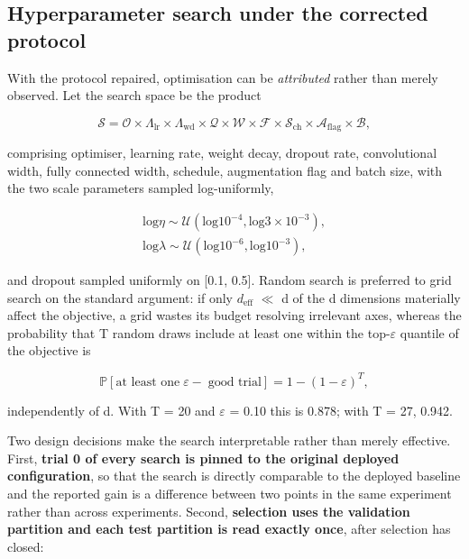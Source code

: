 \FloatBarrier

\subsection{Hyperparameter search under the corrected protocol}

With the protocol repaired, optimisation can be \emph{attributed} rather than merely observed. Let the search space be the product

\begin{equation}
\label{eq:100}
\mathcal{S} = \mathcal{O} \times \Lambda _{\mathrm{lr}} \times \Lambda _{\mathrm{wd}} \times \mathcal{Q} \times \mathcal{W} \times \mathcal{F} \times \mathcal{S}_{\mathrm{ch}} \times \mathcal{A}_{\mathrm{flag}} \times \mathcal{B},
\end{equation}

comprising optimiser, learning rate, weight decay, dropout rate, convolutional width, fully connected width, schedule, augmentation flag and batch size, with the two scale parameters sampled log-uniformly,

\begin{equation}
\label{eq:101}
\begin{aligned}
\mathrm{log} \eta \sim \mathcal{U}( \mathrm{log} 10^{-4}, \mathrm{log} 3 \times 10^{-3} ), \\
\mathrm{log} \lambda \sim \mathcal{U}( \mathrm{log} 10^{-6}, \mathrm{log} 10^{-3} ),
\end{aligned}
\end{equation}

and dropout sampled uniformly on [0.1, 0.5]. Random search  is preferred to grid search on the standard argument: if only $d_{\mathrm{eff}}$ $\ll$ d of the d dimensions materially affect the objective, a grid wastes its budget resolving irrelevant axes, whereas the probability that T random draws include at least one within the top-$\varepsilon$ quantile of the objective is

\begin{equation}
\label{eq:102}
\mathbb{P}[ \text{at least one}\; \varepsilon -\;\text{good trial} ] = 1 - (1 - \varepsilon )^T ,
\end{equation}

independently of d. With T = 20 and $\varepsilon$ = 0.10 this is 0.878; with T = 27, 0.942.

Two design decisions make the search interpretable rather than merely effective. First, \textbf{trial 0 of every search is pinned to the original deployed configuration}, so that the search is directly comparable to the deployed baseline and the reported gain is a difference between two points in the same experiment rather than across experiments. Second, \textbf{selection uses the validation partition and each test partition is read exactly once}, after selection has closed:

